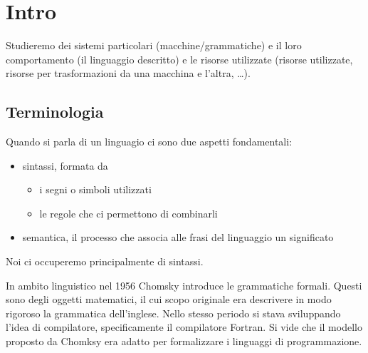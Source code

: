 \documentclass[12pt]{report}
\begin{document}
\tableofcontents
\newpage

\chapter{Intro}
Studieremo dei sistemi particolari (macchine/grammatiche) e il loro comportamento (il linguaggio descritto) e le risorse utilizzate (risorse utilizzate, risorse per trasformazioni da una macchina e l'altra, \dots). 

\section{Terminologia}
Quando si parla di un linguagio ci sono due aspetti fondamentali:
\begin{itemize}
	\item sintassi, formata da
	\begin{itemize}
		\item i segni o simboli utilizzati
		\item le regole che ci permettono di combinarli
	\end{itemize}
	\item semantica, il processo che associa alle frasi del linguaggio un significato
\end{itemize}

Noi ci occuperemo principalmente di sintassi.

In ambito linguistico nel 1956 Chomsky introduce le grammatiche formali.
Questi sono degli oggetti matematici, il cui scopo originale era descrivere in modo rigoroso la grammatica dell'inglese.
Nello stesso periodo si stava sviluppando l'idea di compilatore, specificamente il compilatore Fortran.
Si vide che il modello proposto da Chomksy era adatto per formalizzare i linguaggi di programmazione.
\end{document}
